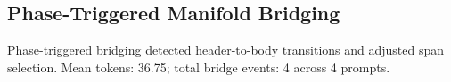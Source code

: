 \subsection{Phase-Triggered Manifold Bridging}
Phase-triggered bridging detected header-to-body transitions and adjusted span selection.
Mean tokens: 36.75; total bridge events: 4 across 4 prompts.
